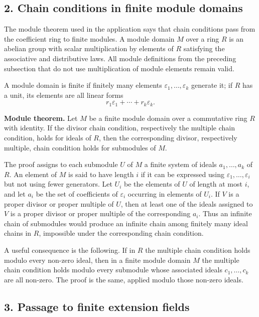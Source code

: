 \documentclass[11pt]{article}
\begin{document}
\subsection{2. Chain conditions in finite module domains}

The module theorem used in the application says that chain conditions pass from the coefficient ring to finite modules. A module domain $M$ over a ring $R$ is an abelian group with scalar multiplication by elements of $R$ satisfying the associative and distributive laws. All module definitions from the preceding subsection that do not use multiplication of module elements remain valid.

A module domain is finite if finitely many elements $\varepsilon_1,\ldots,\varepsilon_k$ generate it; if $R$ has a unit, its elements are all linear forms
\[
  r_1\varepsilon_1+\cdots+r_k\varepsilon_k.
\]

\textbf{Module theorem.} Let $M$ be a finite module domain over a commutative ring $R$ with identity. If the divisor chain condition, respectively the multiple chain condition, holds for ideals of $R$, then the corresponding divisor, respectively multiple, chain condition holds for submodules of $M$.

The proof assigns to each submodule $U$ of $M$ a finite system of ideals $a_1,\ldots,a_k$ of $R$. An element of $M$ is said to have length $i$ if it can be expressed using $\varepsilon_1,
\ldots,\varepsilon_i$ but not using fewer generators. Let $U_i$ be the elements of $U$ of length at most $i$, and let $a_i$ be the set of coefficients of $\varepsilon_i$ occurring in elements of $U_i$. If $V$ is a proper divisor or proper multiple of $U$, then at least one of the ideals assigned to $V$ is a proper divisor or proper multiple of the corresponding $a_i$. Thus an infinite chain of submodules would produce an infinite chain among finitely many ideal chains in $R$, impossible under the corresponding chain condition.

A useful consequence is the following. If in $R$ the multiple chain condition holds modulo every non-zero ideal, then in a finite module domain $M$ the multiple chain condition holds modulo every submodule whose associated ideals $c_1,\ldots,c_k$ are all non-zero. The proof is the same, applied modulo those non-zero ideals.

\subsection{3. Passage to finite extension fields}
\end{document}
